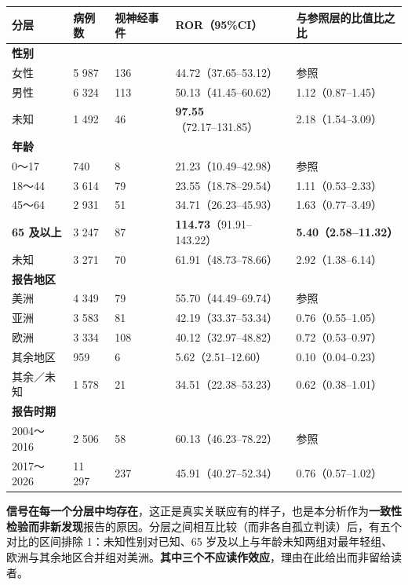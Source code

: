 \documentclass[UTF8,fontset=windows,11pt]{ctexart}
\begin{document}
\begin{center}
\small
\begin{longtable}{p{}p{}p{}p{}p{}}
\hline
分层 & 病例数 & 视神经事件 & ROR（95\%CI） & 与参照层的比值比之比 \\
\hline
\textbf{性别} &  &  &  &  \\
女性 & 5 987 & 136 & 44.72（37.65–53.12） & 参照 \\
男性 & 6 324 & 113 & 50.13（41.45–60.62） & 1.12（0.87–1.45） \\
未知 & 1 492 & 46 & \textbf{97.55}（72.17–131.85） & 2.18（1.54–3.09） \\
\textbf{年龄} &  &  &  &  \\
0～17 & 740 & 8 & 21.23（10.49–42.98） & 参照 \\
18～44 & 3 614 & 79 & 23.55（18.78–29.54） & 1.11（0.53–2.33） \\
45～64 & 2 931 & 51 & 34.71（26.23–45.93） & 1.63（0.77–3.49） \\
\textbf{65 及以上} & 3 247 & 87 & \textbf{114.73}（91.91–143.22） & \textbf{5.40（2.58–11.32）} \\
未知 & 3 271 & 70 & 61.91（48.73–78.66） & 2.92（1.38–6.14） \\
\textbf{报告地区} &  &  &  &  \\
美洲 & 4 349 & 79 & 55.70（44.49–69.74） & 参照 \\
亚洲 & 3 583 & 81 & 42.19（33.37–53.34） & 0.76（0.55–1.05） \\
欧洲 & 3 334 & 108 & 40.12（32.97–48.82） & 0.72（0.53–0.97） \\
其余地区 & 959 & 6 & 5.62（2.51–12.60） & 0.10（0.04–0.23） \\
其余／未知 & 1 578 & 21 & 34.51（22.38–53.23） & 0.62（0.38–1.01） \\
\textbf{报告时期} &  &  &  &  \\
2004～2016 & 2 506 & 58 & 60.13（46.23–78.22） & 参照 \\
2017～2026 & 11 297 & 237 & 45.91（40.27–52.34） & 0.76（0.57–1.02） \\
\hline
\end{longtable}
\end{center}

\textbf{信号在每一个分层中均存在}，这正是真实关联应有的样子，也是本分析作为\textbf{一致性检验而非新发现}报告的原因。分层之间相互比较（而非各自孤立判读）后，有五个对比的区间排除 1：未知性别对已知、65 岁及以上与年龄未知两组对最年轻组、欧洲与其余地区合并组对美洲。\textbf{其中三个不应读作效应}，理由在此给出而非留给读者。
\end{document}
